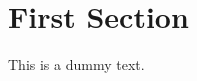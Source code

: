 \documentclass[english,cd=english]{univie-ling-handout}
\begin{document}
\maketitle

\section{First Section}

This is a dummy text.
\end{document}
